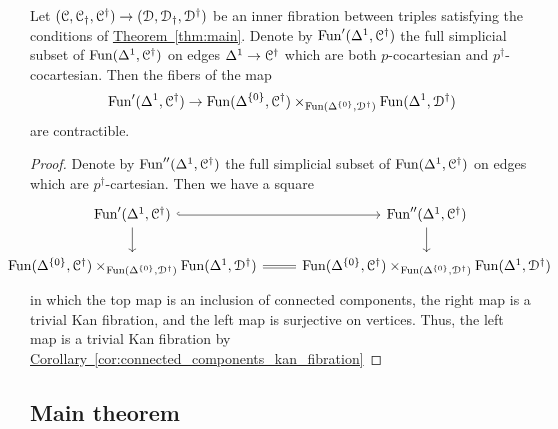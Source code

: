 \documentclass[main.tex]{subfiles}
\begin{document}
\begin{lemma}
  \label{lemma:twice_cartesian_lifts_contractible}
  Let $(\mathcal{C}, \mathcal{C}_{\dagger}, \mathcal{C}^{\dagger}) \to (\mathcal{D}, \mathcal{D}_{\dagger}, \mathcal{D}^{\dagger})$ be an inner fibration between triples satisfying the conditions of \hyperref[thm:main]{Theorem~\ref*{thm:main}}. Denote by $\mathrm{Fun}'(\Delta^{1}, \mathcal{C}^{\dagger})$ the full simplicial subset of $\mathrm{Fun}(\Delta^{1}, \mathcal{C}^{\dagger})$ on edges $\Delta^{1} \to \mathcal{C}^{\dagger}$ which are both $p$-cocartesian and $p^{\dagger}$-cocartesian. Then the fibers of the map
  \begin{equation*}
    \mathrm{Fun}'(\Delta^{1}, \mathcal{C}^{\dagger}) \to
    \mathrm{Fun}(\Delta^{\{0\}}, \mathcal{C}^{\dagger})
    \times_{\mathrm{Fun}(\Delta^{\{0\}}, \mathcal{D}^{\dagger})}
    \mathrm{Fun}(\Delta^{1}, \mathcal{D}^{\dagger})
  \end{equation*}
  are contractible.
\end{lemma}
\begin{proof}
  Denote by $\mathrm{Fun}''(\Delta^{1}, \mathcal{C}^{\dagger})$ the full simplicial subset of $\mathrm{Fun}(\Delta^{1}, \mathcal{C}^{\dagger})$ on edges which are $p^{\dagger}$-cartesian. Then we have a square
  \begin{equation*}
    \noindent\makebox[\textwidth]{%
      \begin{tikzcd}[ampersand replacement=\&]
        \Fun'(\Delta^{1}, \category{C}^{\dagger})
        \arrow[r, hook]
        \arrow[d]
        \& \Fun''(\Delta^{1}, \category{C}^{\dagger})
        \arrow[d]
        \\
        \Fun(\Delta^{\{0\}}, \category{C}^{\dagger})
        \times_{\Fun(\Delta^{\{0\}}, \category{D}^{\dagger})}
        \Fun(\Delta^{1}, \category{D}^{\dagger})
        \arrow[r, equals]
        \& \Fun(\Delta^{\{0\}}, \category{C}^{\dagger})
        \times_{\Fun(\Delta^{\{0\}}, \category{D}^{\dagger})}
        \Fun(\Delta^{1}, \category{D}^{\dagger})
      \end{tikzcd}
    }
  \end{equation*}
  in which the top map is an inclusion of connected components, the right map is a trivial Kan fibration, and the left map is surjective on vertices. Thus, the left map is a trivial Kan fibration by \hyperref[cor:connected_components_kan_fibration]{Corollary~\ref*{cor:connected_components_kan_fibration}}
\end{proof}

\subsection{Main theorem}
\end{document}
